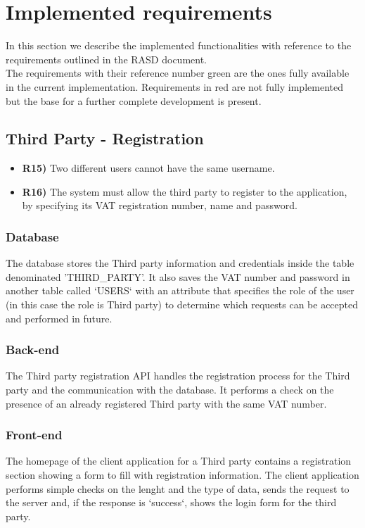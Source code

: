 \section{Implemented requirements}

In this section we describe the implemented functionalities with reference to the requirements outlined in the RASD document.\\
The requirements with their reference number green are the ones fully available in the current implementation. 
Requirements in red are not fully implemented but the base for a further complete development is present.

\subsection{Third Party - Registration}
\begin{itemize}
	\item {\color{Green}\textbf{R15)}} Two different users cannot have the same username.
	\item {\color{Green}\textbf{R16)}} The system must allow the third party to register to the application, by specifying its VAT registration number, name and password.
\end{itemize}

\subsubsection*{Database}
The database stores the Third party information and credentials inside the table denominated 'THIRD_PARTY'. It also saves the VAT number and password in another table called `USERS` with an attribute that specifies the role of the user (in this case the role is Third party) to determine which requests can be accepted and performed in future.\\

\subsubsection*{Back-end}
The Third party registration API handles the registration process for the Third party and the communication with the database. It performs a check on the presence of an already registered Third party with the same VAT number.

\subsubsection*{Front-end}
The homepage of the client application for a Third party contains a registration section showing a form to fill with registration information. The client application performs simple checks on the lenght and the type of data, sends the request to the server and, if the response is `success`,  shows the login form for the third party.


